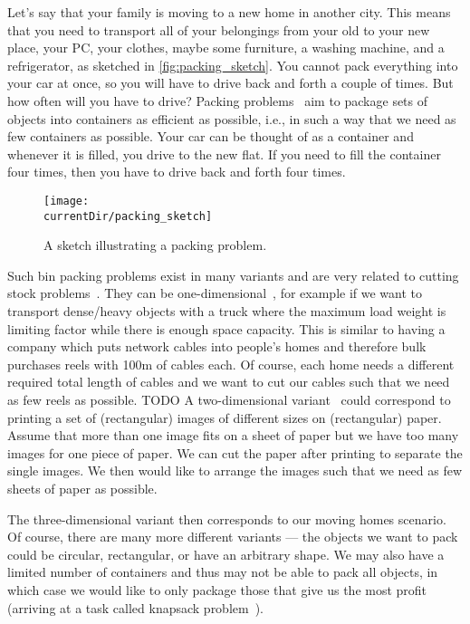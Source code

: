 %
%
Let's say that your family is moving to a new home in another city.
This means that you need to transport all of your belongings from your old to your new place, your PC, your clothes, maybe some furniture, a washing machine, and a refrigerator, as sketched in \autoref{fig:packing_sketch}.
You cannot pack everything into your car at once, so you will have to drive back and forth a couple of times.
But how often will you have to drive?
Packing problems~\cite{S2018ITCAPOPMASM,DF1992CAPIPADATAB} aim to package sets of objects into containers as efficient as possible, i.e., in such a way that we need as few containers as possible.
Your car can be thought of as a container and whenever it is filled, you drive to the new flat.
If you need to fill the container four times, then you have to drive back and forth four times.%
%
\begin{figure}%
\centering%
\texttt{[image: \\currentDir/packing\_sketch]}%
\caption{A sketch illustrating a packing problem.}%
\label{fig:packing_sketch}%
\end{figure}

Such bin packing problems exist in many variants and are very related to cutting stock problems~\cite{DF1992CAPIPADATAB}.
They can be one-dimensional~\cite{DIM2016BPACSPMMAEA}, for example if we want to transport dense/heavy objects with a truck where the maximum load weight is limiting factor while there is enough space capacity.
This is similar to having a company which puts network cables into people's homes and therefore bulk purchases reels with 100m of cables each.
Of course, each home needs a different required total length of cables and we want to cut our cables such that we need as few reels as possible.
TODO
A two-dimensional variant~\cite{LMM2002TDPPAS} could correspond to printing a set of (rectangular) images of different sizes on (rectangular) paper.
Assume that more than one image fits on a sheet of paper but we have too many images for one piece of paper.
We can cut the paper after printing to separate the single images.
We then would like to arrange the images such that we need as few sheets of paper as possible.

The three-dimensional variant then corresponds to our moving homes scenario.
Of course, there are many more different variants --- the objects we want to pack could be circular, rectangular, or have an arbitrary shape.
We may also have a limited number of containers and thus may not be able to pack all objects, in which case we would like to only package those that give us the most profit (arriving at a task called knapsack problem~\cite{MT1990KPAACI}).%
%
\endhsection%
%

